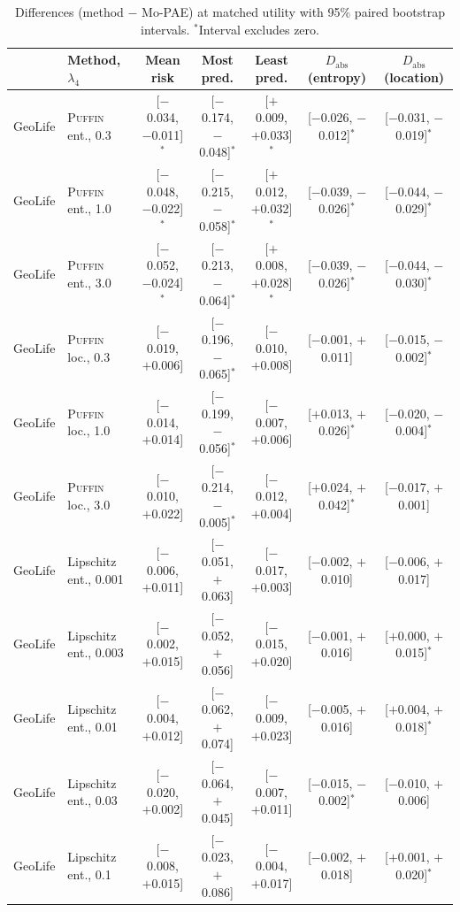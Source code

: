 \documentclass[sigconf,anonymous,review]{acmart}
\newcommand{\puffin}{\textsc{Puffin}}
\begin{document}
\begin{table}[!htbp]
\centering
\caption{Differences (method $-$ Mo-PAE) at matched utility with 95\% paired bootstrap intervals. $^*$Interval excludes zero.}
\label{tab:cis}
\scriptsize
\begin{tabular}{@{}llccccc@{}}
\toprule
 & Method, $\lambda_4$ & Mean risk & Most pred. & Least pred. & $D_{\mathrm{abs}}$ (entropy) & $D_{\mathrm{abs}}$ (location) \\
\midrule
GeoLife & \puffin{} ent., 0.3 & [$-$0.034, $-$0.011]$^*$ & [$-$0.174, $-$0.048]$^*$ & [$+$0.009, $+$0.033]$^*$ & [$-$0.026, $-$0.012]$^*$ & [$-$0.031, $-$0.019]$^*$ \\
GeoLife & \puffin{} ent., 1.0 & [$-$0.048, $-$0.022]$^*$ & [$-$0.215, $-$0.058]$^*$ & [$+$0.012, $+$0.032]$^*$ & [$-$0.039, $-$0.026]$^*$ & [$-$0.044, $-$0.029]$^*$ \\
GeoLife & \puffin{} ent., 3.0 & [$-$0.052, $-$0.024]$^*$ & [$-$0.213, $-$0.064]$^*$ & [$+$0.008, $+$0.028]$^*$ & [$-$0.039, $-$0.026]$^*$ & [$-$0.044, $-$0.030]$^*$ \\
GeoLife & \puffin{} loc., 0.3 & [$-$0.019, $+$0.006] & [$-$0.196, $-$0.065]$^*$ & [$-$0.010, $+$0.008] & [$-$0.001, $+$0.011] & [$-$0.015, $-$0.002]$^*$ \\
GeoLife & \puffin{} loc., 1.0 & [$-$0.014, $+$0.014] & [$-$0.199, $-$0.056]$^*$ & [$-$0.007, $+$0.006] & [$+$0.013, $+$0.026]$^*$ & [$-$0.020, $-$0.004]$^*$ \\
GeoLife & \puffin{} loc., 3.0 & [$-$0.010, $+$0.022] & [$-$0.214, $-$0.005]$^*$ & [$-$0.012, $+$0.004] & [$+$0.024, $+$0.042]$^*$ & [$-$0.017, $+$0.001] \\
GeoLife & Lipschitz ent., 0.001 & [$-$0.006, $+$0.011] & [$-$0.051, $+$0.063] & [$-$0.017, $+$0.003] & [$-$0.002, $+$0.010] & [$-$0.006, $+$0.017] \\
GeoLife & Lipschitz ent., 0.003 & [$-$0.002, $+$0.015] & [$-$0.052, $+$0.056] & [$-$0.015, $+$0.020] & [$-$0.001, $+$0.016] & [$+$0.000, $+$0.015]$^*$ \\
GeoLife & Lipschitz ent., 0.01 & [$-$0.004, $+$0.012] & [$-$0.062, $+$0.074] & [$-$0.009, $+$0.023] & [$-$0.005, $+$0.016] & [$+$0.004, $+$0.018]$^*$ \\
GeoLife & Lipschitz ent., 0.03 & [$-$0.020, $+$0.002] & [$-$0.064, $+$0.045] & [$-$0.007, $+$0.011] & [$-$0.015, $-$0.002]$^*$ & [$-$0.010, $+$0.006] \\
GeoLife & Lipschitz ent., 0.1 & [$-$0.008, $+$0.015] & [$-$0.023, $+$0.086] & [$-$0.004, $+$0.017] & [$-$0.002, $+$0.018] & [$+$0.001, $+$0.020]$^*$ \\

\end{tabular}
\end{table}
\end{document}
